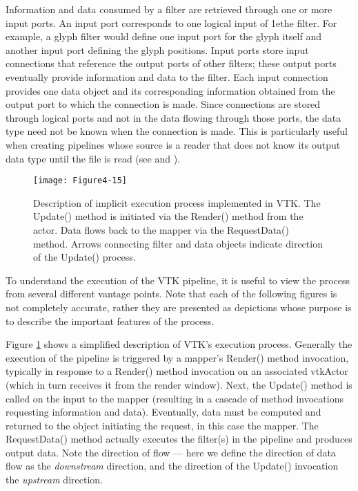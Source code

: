 Information and data consumed by a filter are retrieved through one or more input ports. An input port corresponds to one logical input of 1ethe filter. For example, a glyph filter would define one input port for the glyph itself and another input port defining the glyph positions. Input ports store input connections that reference the output ports of other filters; these output ports eventually provide information and data to the filter. Each input connection provides one data object and its corresponding information obtained from the output port to which the connection is made. Since connections are stored through logical ports and not in the data flowing through those ports, the data type need not be known when the connection is made. This is particularly useful when creating pipelines whose source is a reader that does not know its output data type until the file is read (see  and ).

\begin{figure}[!htb]
  \centering
  \texttt{[image: Figure4-15]}\\
  \caption{Description of implicit execution process implemented in VTK. The Update() method is initiated via the Render() method from the actor. Data flows back to the mapper via the RequestData() method. Arrows connecting filter and data objects indicate direction of the Update() process.}\label{fig:Figure4-15}
\end{figure}

To understand the execution of the VTK pipeline, it is useful to view the process from several different vantage points. Note that each of the following figures is not completely accurate, rather they are presented as depictions whose purpose is to describe the important features of the process.

Figure \ref{fig:Figure4-15} shows a simplified description of VTK's execution process. Generally the execution of the pipeline is triggered by a mapper's Render() method invocation, typically in response to a Render() method invocation on an associated vtkActor (which in turn receives it from the render window). Next, the Update() method is called on the input to the mapper (resulting in a cascade of method invocations requesting information and data). Eventually, data must be computed and returned to the object initiating the request, in this case the mapper. The RequestData() method actually executes the filter(s) in the pipeline and produces output data. Note the direction of flow --- here we define the direction of data flow as the \emph{downstream} direction, and the direction of the Update() invocation the \emph{upstream} direction.

